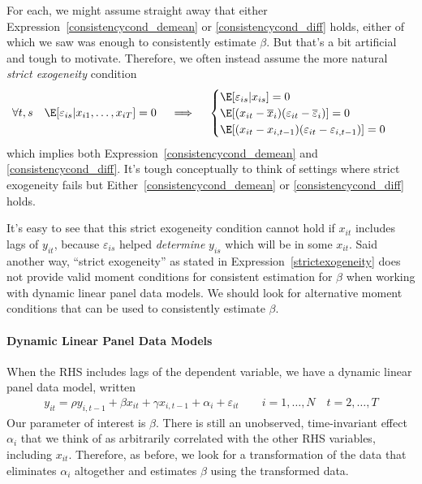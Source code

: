 \documentclass[12pt]{article}
\theoremstyle{plain}
\theoremstyle{definition}
\theoremstyle{remark}
\begin{document}
For each, we might assume straight away that either
Expression~\ref{consistencycond_demean} or \ref{consistencycond_diff}
holds, either of which we saw was enough to consistently estimate
$\beta$.
But that's a bit artificial and tough to motivate.
Therefore, we often instead assume the more natural
\emph{strict exogeneity} condition
\begin{align}
  \forall t,s
  \quad
  \E[\varepsilon_{is}|x_{i1},\ldots,x_{iT}]
  &= 0
  \quad\implies\quad
  \begin{cases}
    \E[\varepsilon_{is}|x_{is}]=0
    \\
    \E[(x_{it}-\overline{x}_i)(\varepsilon_{it}-\overline{\varepsilon}_i)]=0
    \\
    \E[(x_{it}-{x}_{i,t-1})(\varepsilon_{it}-{\varepsilon}_{i,t-1})]=0
  \end{cases}
  \label{strictexogeneity}
\end{align}
which implies both Expression~\ref{consistencycond_demean} and
\ref{consistencycond_diff}.
It's tough conceptually to think of settings where strict exogeneity
fails but Either~\ref{consistencycond_demean} or
\ref{consistencycond_diff} holds.

It's easy to see that this strict exogeneity condition cannot hold
if $x_{it}$ includes lags of $y_{it}$, because $\varepsilon_{is}$ helped
\emph{determine} $y_{is}$ which will be in some $x_{it}$.
Said another way, ``strict exogeneity'' as stated in
Expression~\ref{strictexogeneity} does not provide valid moment
conditions for consistent estimation for $\beta$ when working with
dynamic linear panel data models.
We should look for alternative moment conditions that can be used to
consistently estimate $\beta$.


\paragraph{Dynamic Linear Panel Data Models}
When the RHS includes lags of the dependent variable, we have a dynamic
linear panel data model, written
\begin{align}
  y_{it}
  =
  \rho y_{i,t-1}
  + \beta x_{it}
  + \gamma x_{i,t-1}
  + \alpha_i
  + \varepsilon_{it}
  \qquad
  i = 1,\ldots,N
  \quad
  t = 2,\ldots,T
  \label{dynamic}
\end{align}
Our parameter of interest is $\beta$.
There is still an unobserved, time-invariant effect $\alpha_i$ that we
think of as arbitrarily correlated with the other RHS variables,
including $x_{it}$.
Therefore, as before, we look for a transformation of the data that
eliminates $\alpha_i$ altogether and estimates $\beta$ using the
transformed data.
\end{document}
